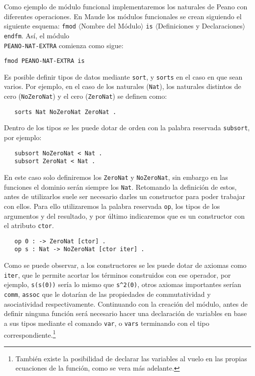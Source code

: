 Como ejemplo de módulo funcional implementaremos los naturales de Peano con diferentes operaciones. En Maude los módulos funcionales se crean siguiendo el siguiente esquema: \texttt{fmod} $\langle$Nombre del Módulo$\rangle$ \texttt{is} $\langle$Definiciones y Declaraciones$\rangle$ \texttt{endfm}. Así, el módulo\\ \texttt{PEANO-NAT-EXTRA} comienza como sigue: \par

{\codesize
\begin{verbatim}
fmod PEANO-NAT-EXTRA is
\end{verbatim}
}

Es posible definir tipos de datos mediante \texttt{sort}, y \texttt{sorts} en el caso en que sean varios. Por ejemplo, en el caso de los naturales (\texttt{Nat}), los naturales distintos de cero (\texttt{NoZeroNat}) y el cero (\texttt{ZeroNat}) se definen como:\par

{\codesize
\begin{verbatim}
   sorts Nat NoZeroNat ZeroNat .
\end{verbatim}
}

Dentro de los tipos se les puede dotar de orden con la palabra reservada \texttt{subsort}, por ejemplo: \par

{\codesize
\begin{verbatim}
   subsort NoZeroNat < Nat .
   subsort ZeroNat < Nat .
\end{verbatim}
}

En este caso solo definiremos los \texttt{ZeroNat} y \texttt{NoZeroNat}, sin embargo en las funciones el dominio serán siempre los \texttt{Nat}. Retomando la definición de estos, antes de utilizarlos suele ser necesario darles un constructor para poder trabajar con ellos. Para ello utilizaremos la palabra reservada \texttt{op}, los tipos de los argumentos y del resultado, y por último indicaremos que es un constructor con el atributo \texttt{ctor}. \par

{\codesize
\begin{verbatim}
   op 0 : -> ZeroNat [ctor] .
   op s : Nat -> NoZeroNat [ctor iter] .
\end{verbatim}
}

Como se puede observar, a los constructores se les puede dotar de axiomas como \texttt{iter}, que le permite acortar los términos construidos con ese operador, por ejemplo, \verb"s(s(0))" sería lo mismo que \verb"s^2(0)", otros axiomas importantes serían \texttt{comm}, \texttt{assoc} que le dotarían de las propiedades de commutatividad y asociatividad respectivamente. Continuando con la creación del módulo, antes de definir ninguna función será necesario hacer una declaración de variables en base a sus tipos mediante el comando \texttt{var}, o \texttt{vars} terminando con el tipo correspondiente.\footnote{También existe la posibilidad de declarar las variables al vuelo en las propias ecuaciones de la función, como se vera más adelante.} \par

